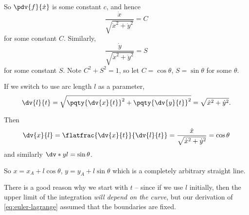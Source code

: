 So \(\pdv{f}{\dot{x}}\) is some constant \(c\), and hence
\[
    \frac{\dot{x}}{\sqrt{\dot{x}^2 + \dot{y}^2}} = C
\]
for some constant \(C\). Similarly,
\[
    \frac{\dot{y}}{\sqrt{\dot{x}^2 + \dot{y}^2}} = S
\]
for some constant \(S\). Note \(C^2 + S^2 = 1\), so let \(C = \cos \theta\), \(S = \sin \theta\) for some \(\theta\).

If we switch to use arc length \(l\) as a parameter,
\[
    \dv{l}{t} = \sqrt{\pqty{\dv{x}{t}}^2 + \pqty{\dv{y}{t}}^2} = \sqrt{\dot{x}^2 + \dot{y}^2}.
\]

Then
\[
    \dv{x}{l} = \flatfrac{\dv{x}{t}}{\dv{l}{t}} = \frac{\dot{x}}{\sqrt{{\dot{x}}^2 + {\dot{y}}^2}} = \cos \theta
\]
and similarly \(\dv*{y}{l} = \sin \theta\).

So \(x = x_A + l \cos \theta\), \(y = y_A + l \sin \theta\) which is a completely arbitrary straight line.

\begin{remark}
    There is a good reason why we start with \(t\) -- since if we use \(l\) initially, then the upper limit of the integration \emph{will depend on the curve}, but our derivation of \eqref{eq:euler-lagrange} assumed that the boundaries are fixed.
\end{remark}